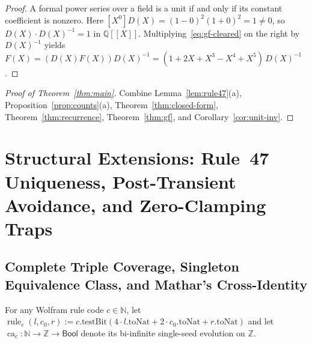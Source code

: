 \documentclass[11pt]{article}
\newcommand{\llbracket}{[\![}
\newcommand{\rrbracket}{]\!]}
\theoremstyle{definition}
\newcommand{\N}{\mathbb{N}}
\newcommand{\Z}{\mathbb{Z}}
\newcommand{\Q}{\mathbb{Q}}
\newcommand{\ca}{\operatorname{ca}}
\begin{document}
\begin{proof}
A formal power series over a field is a unit if and only if its constant coefficient is nonzero. Here $[X^0]D(X) = (1 - 0)^2(1 + 0)^2 = 1 \ne 0$, so $D(X) \cdot D(X)^{-1} = 1$ in $\Q\llbracket X \rrbracket$. Multiplying~\eqref{eq:gf-cleared} on the right by $D(X)^{-1}$ yields $F(X) = (D(X) F(X)) D(X)^{-1} = (1 + 2X + X^3 - X^4 + X^5)\,D(X)^{-1}$.
\end{proof}

\begin{proof}[Proof of Theorem~\ref{thm:main}]
Combine Lemma~\ref{lem:rule47}(a), Proposition~\ref{prop:counts}(a), Theorem~\ref{thm:closed-form}, Theorem~\ref{thm:recurrence}, Theorem~\ref{thm:gf}, and Corollary~\ref{cor:unit-inv}.
\end{proof}

\section{Structural Extensions: Rule~47 Uniqueness, Post-Transient Avoidance, and Zero-Clamping Traps}
\label{sec:structure}

\subsection{Complete Triple Coverage, Singleton Equivalence Class, and Mathar's Cross-Identity}

For any Wolfram rule code $c \in \N$, let $\operatorname{rule}_c(l, c_0, r) := c.\mathrm{testBit}(4 \cdot l.\mathrm{toNat} + 2 \cdot c_0.\mathrm{toNat} + r.\mathrm{toNat})$ and let $\ca_c : \N \to \Z \to \mathsf{Bool}$ denote its bi-infinite single-seed evolution on $\Z$.
\end{document}
